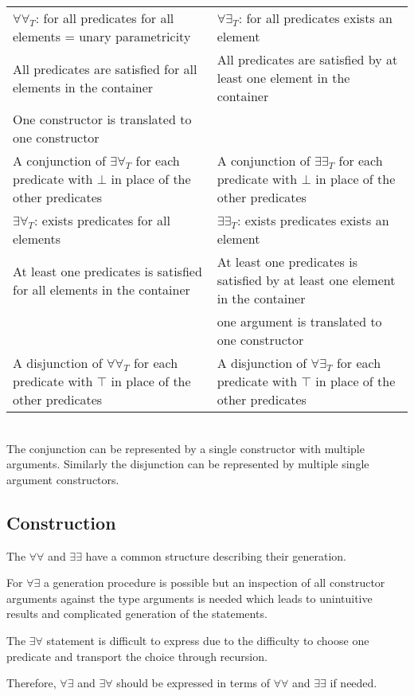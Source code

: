 \noindent
{}
\begin{tabularx}{\textwidth}{ m|m }
$\forall\forall_T$: for all predicates for all elements = unary parametricity &
$\forall\exists_T$: for all predicates exists an element \\
All predicates are satisfied for all elements in the container &
All predicates are satisfied by at least one element in the container \\
One constructor is translated to one constructor &
\\
A conjunction of $\exists\forall_T$ for each predicate with $\bot$ in place of the other predicates &
A conjunction of $\exists\exists_T$ for each predicate with $\bot$ in place of the other predicates \\
\hline
$\exists\forall_T$: exists predicates for all elements &
$\exists\exists_T$: exists predicates exists an element \\
At least one predicates is satisfied for all elements in the container &
At least one predicates is satisfied by at least one element in the container \\
&
one argument is translated to one constructor\\
A disjunction of $\forall\forall_T$ for each predicate with $\top$ in place of the other predicates &
A disjunction of $\forall\exists_T$ for each predicate with $\top$ in place of the other predicates
\end{tabularx}
\ \\
The conjunction can be represented by a single constructor with multiple arguments.
Similarly the disjunction can be represented by multiple single argument constructors.


\subsection{Construction}
The $\forall\forall$ and $\exists\exists$ have a common structure describing
their generation.

For $\forall\exists$ a generation procedure is possible but an inspection of 
all constructor arguments against the type arguments is needed which leads
to unintuitive results and complicated generation of the statements.

The $\exists\forall$ statement is difficult to express due to the difficulty
to choose one predicate and transport the choice through recursion.

Therefore, $\forall\exists$ and $\exists\forall$ should be expressed in terms
of $\forall\forall$ and $\exists\exists$ if needed.

